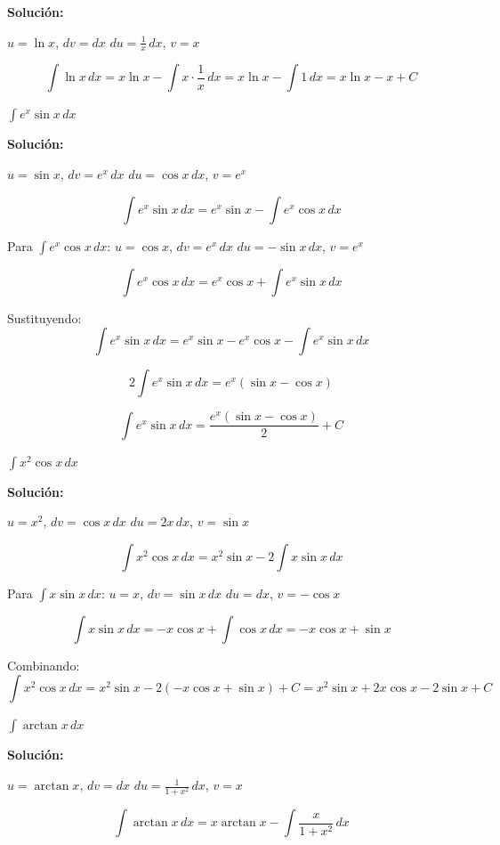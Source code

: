 \documentclass[12pt, a4paper]{book}
\begin{document}
\textbf{Solución:}

$u = \ln x$, $dv = dx$
$du = \frac{1}{x} \, dx$, $v = x$

\[
\int \ln x \, dx = x\ln x - \int x \cdot \frac{1}{x} \, dx = x\ln x - \int 1 \, dx = x\ln x - x + C
\]

\begin{ejercicio}
$\int e^x \sin x \, dx$
\end{ejercicio}

\textbf{Solución:}

$u = \sin x$, $dv = e^x \, dx$
$du = \cos x \, dx$, $v = e^x$

\[
\int e^x \sin x \, dx = e^x \sin x - \int e^x \cos x \, dx
\]

Para $\int e^x \cos x \, dx$:
$u = \cos x$, $dv = e^x \, dx$
$du = -\sin x \, dx$, $v = e^x$

\[
\int e^x \cos x \, dx = e^x \cos x + \int e^x \sin x \, dx
\]

Sustituyendo:
\[
\int e^x \sin x \, dx = e^x \sin x - e^x \cos x - \int e^x \sin x \, dx
\]

\[
2\int e^x \sin x \, dx = e^x(\sin x - \cos x)
\]

\[
\int e^x \sin x \, dx = \frac{e^x(\sin x - \cos x)}{2} + C
\]

\begin{ejercicio}
$\int x^2 \cos x \, dx$
\end{ejercicio}

\textbf{Solución:}

$u = x^2$, $dv = \cos x \, dx$
$du = 2x \, dx$, $v = \sin x$

\[
\int x^2 \cos x \, dx = x^2 \sin x - 2\int x \sin x \, dx
\]

Para $\int x \sin x \, dx$:
$u = x$, $dv = \sin x \, dx$
$du = dx$, $v = -\cos x$

\[
\int x \sin x \, dx = -x\cos x + \int \cos x \, dx = -x\cos x + \sin x
\]

Combinando:
\[
\int x^2 \cos x \, dx = x^2 \sin x - 2(-x\cos x + \sin x) + C = x^2\sin x + 2x\cos x - 2\sin x + C
\]

\begin{ejercicio}
$\int \arctan x \, dx$
\end{ejercicio}

\textbf{Solución:}

$u = \arctan x$, $dv = dx$
$du = \frac{1}{1+x^2} \, dx$, $v = x$

\[
\int \arctan x \, dx = x\arctan x - \int \frac{x}{1+x^2} \, dx
\]
\end{document}
